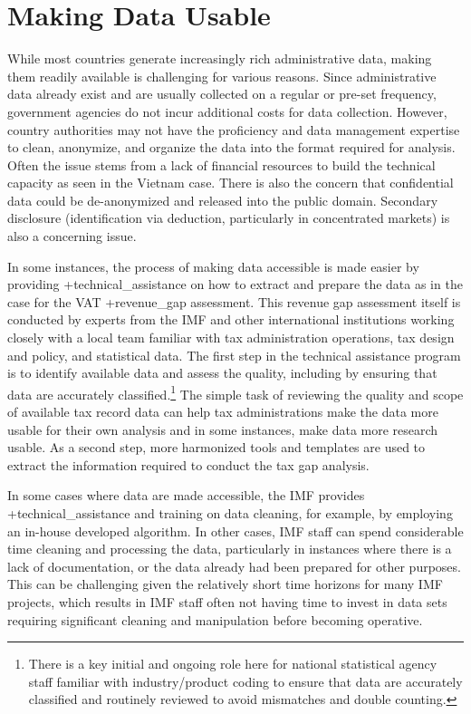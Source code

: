 \documentclass[
]{book}
\begin{document}
\hypertarget{making-data-usable}{%
\section{Making Data Usable}\label{making-data-usable}}

While most countries generate increasingly rich administrative data, making them readily available is challenging for various reasons. Since administrative data already exist and are usually collected on a regular or pre-set frequency, government agencies do not incur additional costs for data collection. However, country authorities may not have the proficiency and data management expertise to clean, anonymize, and organize the data into the format required for analysis. Often the issue stems from a lack of financial resources to build the technical capacity as seen in the Vietnam case. There is also the concern that confidential data could be de-anonymized and released into the public domain. Secondary disclosure (identification via deduction, particularly in concentrated markets) is also a concerning issue.

In some instances, the process of making data accessible is made easier by providing +technical\_assistance\textbar{} on how to extract and prepare the data as in the case for the VAT +revenue\_gap\textbar{} assessment. This revenue gap assessment itself is conducted by experts from the IMF and other international institutions working closely with a local team familiar with tax administration operations, tax design and policy, and statistical data. The first step in the technical assistance program is to identify available data and assess the quality, including by ensuring that data are accurately classified.\footnote{There is a key initial and ongoing role here for national statistical agency staff familiar with industry/product coding to ensure that data are accurately classified and routinely reviewed to avoid mismatches and double counting.} The simple task of reviewing the quality and scope of available tax record data can help tax administrations make the data more usable for their own analysis and in some instances, make data more research usable. As a second step, more harmonized tools and templates are used to extract the information required to conduct the tax gap analysis.

In some cases where data are made accessible, the IMF provides +technical\_assistance\textbar{} and training on data cleaning, for example, by employing an in-house developed algorithm. In other cases, IMF staff can spend considerable time cleaning and processing the data, particularly in instances where there is a lack of documentation, or the data already had been prepared for other purposes. This can be challenging given the relatively short time horizons for many IMF projects, which results in IMF staff often not having time to invest in data sets requiring significant cleaning and manipulation before becoming operative.
\end{document}
